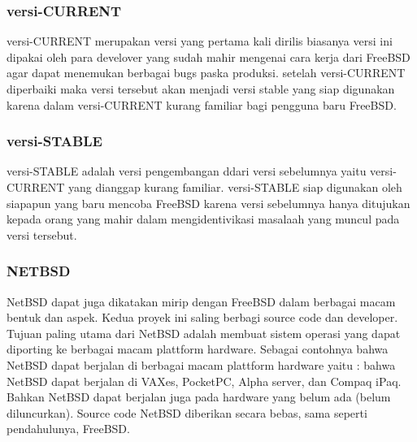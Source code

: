 \subsubsection{versi-CURRENT}
	versi-CURRENT merupakan versi yang pertama kali dirilis biasanya versi ini dipakai oleh para develover yang sudah mahir mengenai
	cara kerja dari FreeBSD agar dapat menemukan berbagai bugs paska produksi. setelah versi-CURRENT diperbaiki maka versi tersebut
	akan menjadi versi stable yang siap digunakan karena dalam versi-CURRENT kurang familiar bagi pengguna baru FreeBSD.
\subsubsection{versi-STABLE}
	versi-STABLE adalah versi pengembangan ddari versi sebelumnya yaitu versi-CURRENT yang dianggap kurang familiar.
	versi-STABLE siap digunakan oleh siapapun yang baru mencoba FreeBSD karena versi sebelumnya hanya ditujukan kepada
	orang yang mahir dalam mengidentivikasi masalaah yang muncul pada versi tersebut.
\subsubsection{NETBSD}
	NetBSD dapat juga dikatakan mirip dengan FreeBSD dalam berbagai macam bentuk dan aspek. Kedua proyek ini saling berbagi source code dan developer. 
	Tujuan paling utama dari NetBSD adalah membuat sistem operasi yang dapat diporting ke berbagai macam plattform hardware. 
	Sebagai contohnya bahwa NetBSD dapat berjalan di berbagai macam plattform hardware yaitu : bahwa NetBSD dapat berjalan di VAXes, PocketPC, Alpha server, dan Compaq iPaq. Bahkan NetBSD dapat berjalan juga pada hardware yang belum ada (belum diluncurkan). 
	Source code NetBSD diberikan secara bebas, sama seperti pendahulunya, FreeBSD.
